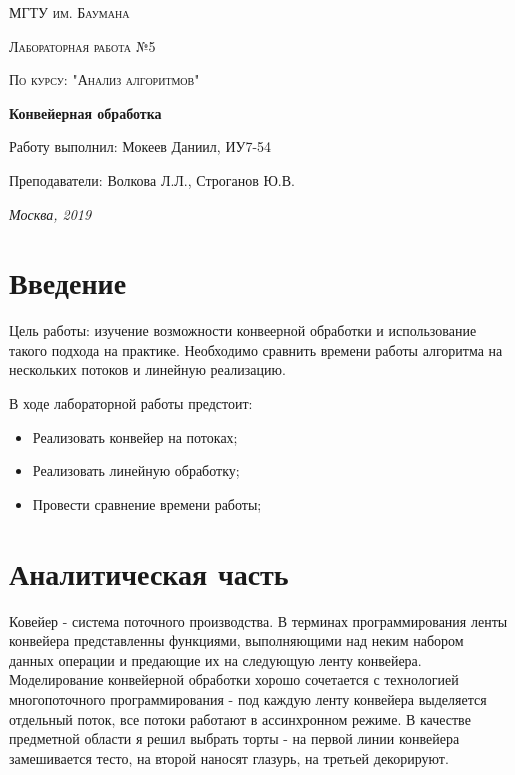 \documentclass[12pt]{report}
\begin{document}
\begin{titlepage}
	\centering
	{\scshape\LARGE МГТУ им. Баумана \par}
	\vspace{3cm}
	{\scshape\Large Лабораторная работа №5\par}
	\vspace{0.5cm}	
	{\scshape\Large По курсу: "Анализ алгоритмов"\par}
	\vspace{1.5cm}
	{\huge\bfseries Конвейерная обработка\par}
	\vspace{2cm}
	\Large Работу выполнил: Мокеев Даниил, ИУ7-54\par
	\vspace{0.5cm}
	\Large Преподаватели:  Волкова Л.Л., Строганов Ю.В.\par

	\vfill
	\large \textit {Москва, 2019} \par
\end{titlepage}

\tableofcontents

\newpage
\chapter*{Введение}

Цель работы: изучение возможности конвеерной обработки и использование такого подхода на практике. Необходимо сравнить времени работы алгоритма на нескольких потоков и линейную реализацию.

В ходе лабораторной работы предстоит:
\begin{itemize}
	\item Реализовать конвейер на потоках; 
	\item Реализовать линейную обработку; 
	\item Провести сравнение времени работы;
\end{itemize}

\chapter{Аналитическая часть}
Ковейер - система поточного производства. В терминах программирования ленты конвейера представленны функциями, выполняющими над неким набором данных операции и предающие их на следующую ленту конвейера. Моделирование конвейерной обработки хорошо сочетается с технологией многопоточного программирования - под каждую ленту конвейера выделяется отдельный поток, все потоки работают в ассинхронном режиме.
В качестве предметной области я решил выбрать торты - на первой линии конвейера замешивается тесто, на второй наносят глазурь, на третьей декорируют.
\end{document}
